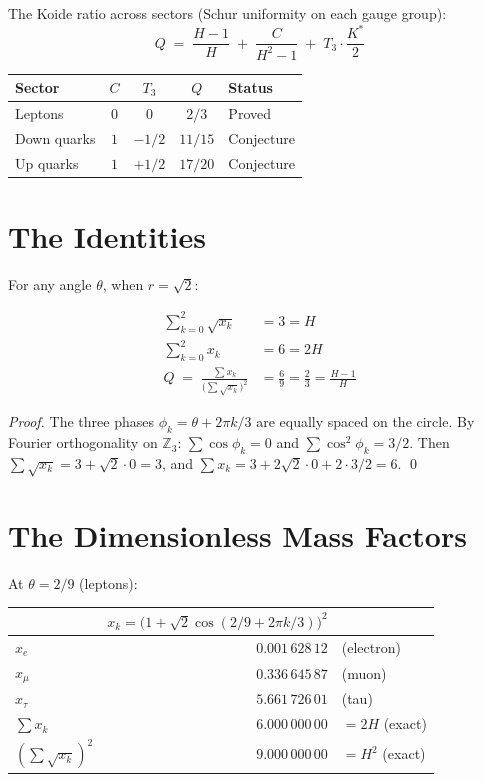 \documentclass[11pt,a4paper]{article}
\theoremstyle{definition}
\theoremstyle{remark}
\newcommand{\Z}{\mathbb{Z}}
\begin{document}
\bigskip

The Koide ratio across sectors (Schur uniformity on each gauge group):
\begin{equation}\label{eq:Q_sectors}
Q \;=\; \frac{H\!-\!1}{H} \;+\; \frac{C}{H^2\!-\!1} \;+\; T_3\cdot\frac{K^*}{2}
\end{equation}
\begin{center}
\begin{tabular}{@{}lcccl@{}}
\toprule
\textbf{Sector} & $C$ & $T_3$ & $Q$ & \textbf{Status} \\
\midrule
Leptons & $0$ & $0$ & $2/3$ & Proved \\
Down quarks & $1$ & $-1/2$ & $11/15$ & Conjecture \\
Up quarks & $1$ & $+1/2$ & $17/20$ & Conjecture \\
\bottomrule
\end{tabular}
\end{center}

\section*{The Identities}

For any angle $\theta$, when $r=\sqrt{2}$:

\begin{align}
\sum_{k=0}^{2} \sqrt{x_k} &= 3 = H \label{eq:sum_sqrt}\\[4pt]
\sum_{k=0}^{2} x_k &= 6 = 2H \label{eq:sum_x}\\[4pt]
Q \;=\; \frac{\sum x_k}{\bigl(\sum\sqrt{x_k}\bigr)^2} &= \frac{6}{9} = \frac{2}{3} = \frac{H\!-\!1}{H} \label{eq:Q}
\end{align}

\emph{Proof.} The three phases $\phi_k = \theta + 2\pi k/3$ are equally spaced on the circle. By Fourier orthogonality on $\Z_3$: $\sum\cos\phi_k = 0$ and $\sum\cos^2\!\phi_k = 3/2$. Then $\sum\sqrt{x_k} = 3 + \sqrt{2}\cdot 0 = 3$, and $\sum x_k = 3 + 2\sqrt{2}\cdot 0 + 2\cdot 3/2 = 6$. \qed

\section*{The Dimensionless Mass Factors}

At $\theta = 2/9$ (leptons):
\begin{center}
\begin{tabular}{@{}lrl@{}}
\toprule
& $x_k = \bigl(1+\sqrt{2}\cos(2/9+2\pi k/3)\bigr)^2$ & \\
\midrule
$x_e$ & $0.001\,628\,12$ & (electron) \\
$x_\mu$ & $0.336\,645\,87$ & (muon) \\
$x_\tau$ & $5.661\,726\,01$ & (tau) \\
\midrule
$\sum x_k$ & $6.000\,000\,00$ & $= 2H$ (exact) \\
$(\sum\sqrt{x_k})^2$ & $9.000\,000\,00$ & $= H^2$ (exact) \\
\bottomrule
\end{tabular}
\end{center}
\end{document}

